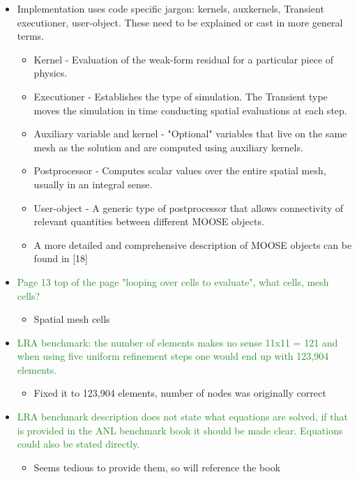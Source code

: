 \documentclass{elsarticle}
\newcommand{\done}{\checkmark}
\newcommand{\easy}[1]{\textcolor{ForestGreen}{#1}}
\newcommand{\medm}[1]{\textcolor{BurntOrange}{#1}}
\begin{document}
\begin{itemize}
\item[\done] \medm{ Implementation uses code specific jargon: kernels, auxkernels, Transient executioner, user-object. These need to be explained or cast in more general terms. }
\begin{itemize}
\item Kernel - Evaluation of the weak-form residual for a particular piece of physics.
\item Executioner - Establishes the type of simulation. The Transient type moves the simulation in time conducting spatial evaluations at each step.
\item Auxiliary variable and kernel - "Optional" variables that live on the same mesh as the solution and are computed using auxiliary kernels. 
\item Postprocessor - Computes scalar values over the entire spatial mesh, usually in an integral sense.
\item User-object - A generic type of postprocessor that allows connectivity of relevant quantities between different MOOSE objects.
\item A more detailed and comprehensive description of MOOSE objects can be found in [18]
\end{itemize}

\item[\done] \easy{ Page 13 top of the page "looping over cells to evaluate", what cells, mesh cells? }
\begin{itemize}
\item Spatial mesh cells
\end{itemize}

\item[\done] \easy{ LRA benchmark: the number of elements makes no sense 11x11 = 121 and when using five uniform refinement steps one would end up with 123,904 elements. }
\begin{itemize}
\item  Fixed it to 123,904 elements, number of nodes was originally correct
\end{itemize}

\item[\done] \easy{ LRA benchmark description does not state what equations are solved, if that is provided in the ANL benchmark book it should be made clear. Equations could also be stated directly. }
\begin{itemize}
\item  Seems tedious to provide them, so will reference the book
\end{itemize}


\end{itemize}
\end{document}
